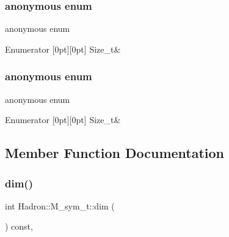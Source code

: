 \subsubsection{\texorpdfstring{anonymous enum}{anonymous enum}}
{\footnotesize\ttfamily anonymous enum}

\begin{DoxyEnumFields}{Enumerator}
[0pt][0pt]{}\mbox{\label{structHadron_1_1M__sym__t_a1137b3433247b356fea83722e6c1d354a89b69a9b3569a16794a38da9585da200}} 
Size\+\_\+t&\\
\hline

\end{DoxyEnumFields}
\mbox{\label{structHadron_1_1M__sym__t_a1137b3433247b356fea83722e6c1d354}} 
\subsubsection{\texorpdfstring{anonymous enum}{anonymous enum}}
{\footnotesize\ttfamily anonymous enum}

\begin{DoxyEnumFields}{Enumerator}
[0pt][0pt]{}\mbox{\label{structHadron_1_1M__sym__t_a1137b3433247b356fea83722e6c1d354a89b69a9b3569a16794a38da9585da200}} 
Size\+\_\+t&\\
\hline

\end{DoxyEnumFields}


\subsection{Member Function Documentation}
\mbox{\label{structHadron_1_1M__sym__t_a9ee8ba6fd6c2220231052690b2995ed5}} 
\subsubsection{\texorpdfstring{dim()}{dim()}\hspace{0.1cm}{\footnotesize\ttfamily [1/3]}}
{\footnotesize\ttfamily int Hadron\+::\+M\+\_\+sym\+\_\+t\+::dim (\begin{DoxyParamCaption}{ }\end{DoxyParamCaption}) const\hspace{0.3cm}{\ttfamily [inline]}, {\ttfamily [virtual]}}



